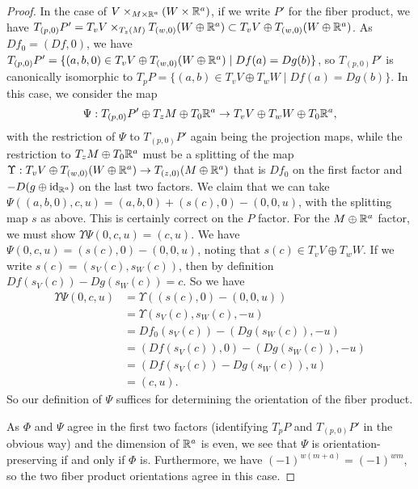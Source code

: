 \begin{proof}
	In the case of $V\times_{M \times \mathbb{R}^a } (W \times \mathbb{R}^a )$, if we write $P'$ for the fiber product,
	we have $T_{(p,0)}P' = T_vV \times_{T_z(M)} T_{(w,0)}(W \oplus \mathbb{R}^a) \subset T_vV \oplus T_{(w,0)}(W \oplus \mathbb{R}^a)$.
	As $Df_0 = (Df,0)$, we have $T_{(p,0)}P' = \{(a,b,0) \in T_vV \oplus T_{(w,0)}(W \oplus \mathbb{R}^a) \mid Df(a)=Dg(b)\}$, so $T_{(p,0)}P'$ is canonically isomorphic to $T_pP = \{(a,b) \in T_vV \oplus T_wW \mid Df(a)=Dg(b)\}$.
	In this case, we consider the map
	\begin{equation}\label{E: fiber plus euclidean}
		\Psi: T_{(p,0)}P' \oplus T_zM \oplus T_0\mathbb{R}^a \to T_vV \oplus T_wW \oplus T_0\mathbb{R}^a ,
	\end{equation}
	with the restriction of $\Psi$ to $T_{(p,0)}P'$ again being the projection maps, while the restriction to $T_zM \oplus T_0\mathbb{R}^a$ must be a splitting of the map $\Upsilon: T_vV \oplus T_{(w,0)}(W \oplus \mathbb{R}^a) \to T_{(z,0)}(M \oplus \mathbb{R}^a)$ that is $Df_0$ on the first factor and $-D(g \oplus \mathrm{id}_{\mathbb{R}^a })$ on the last two factors.
	We claim that we can take $\Psi((a,b,0),c,u) = (a,b,0)+(s(c),0)-(0,0,u)$, with the splitting map $s$ as above.
	This is certainly correct on the $P$ factor.
	For the $M \oplus \mathbb{R}^a $ factor, we must show $\Upsilon \Psi(0,c,u) = (c,u)$.
	We have $\Psi(0,c,u) = (s(c),0)-(0,0,u)$, noting that $s(c) \in T_vV \oplus T_wW$.
	If we write $s(c) = (s_V(c),s_W(c))$, then by definition $Df(s_V(c))-Dg(s_W(c)) = c$.
	So we have
	\begin{align*}
		\Upsilon \Psi(0,c,u) & =
		\Upsilon((s(c),0)-(0,0,u))\\& =
		\Upsilon(s_V(c),s_W(c),-u)\\& =
		Df_0(s_V(c))-(Dg(s_W(c)),-u)\\& =
		(Df(s_V(c)),0)-(Dg(s_W(c)),-u)\\& =
		(Df(s_V(c))-Dg(s_W(c)),u)\\& =
		(c,u).
	\end{align*}
	So our definition of $\Psi$ suffices for determining the orientation of the fiber product.

	As $\Phi$ and $\Psi$ agree in the first two factors (identifying $T_pP$ and $T_{(p,0)}P'$ in the obvious way) and the dimension of $\mathbb{R}^a $ is even, we see that $\Psi$ is orientation-preserving if and only if $\Phi$ is.
	Furthermore, we have $(-1)^{w(m+a)} = (-1)^{wm}$, so the two fiber product orientations agree in this case.


\end{proof}
